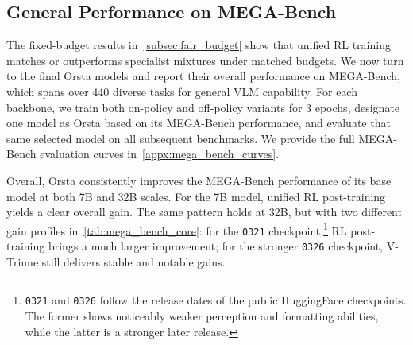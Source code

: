 \begin{table}[t]
\begin{minipage}[t]{0.68\linewidth}
\vspace{10pt}

\label{tab:gui_extension}
\vspace{4pt}


\small
\setlength{\tabcolsep}{20pt}


\end{minipage}

\end{table}

\subsection{General Performance on MEGA-Bench}
\label{subsec:mega_bench}

The fixed-budget results in~\cref{subsec:fair_budget} show that unified RL training matches or outperforms specialist mixtures under matched budgets.
%
We now turn to the final Orsta models and report their overall performance on MEGA-Bench, which spans over 440 diverse tasks for general VLM capability.
%
For each backbone, we train both on-policy and off-policy variants for 3 epochs, designate one model as Orsta based on its MEGA-Bench performance, and evaluate that same selected model on all subsequent benchmarks.
%
We provide the full MEGA-Bench evaluation curves in~\cref{appx:mega_bench_curves}.

Overall, Orsta consistently improves the MEGA-Bench performance of its base model at both 7B and 32B scales.
%
For the 7B model, unified RL post-training yields a clear overall gain.
%
The same pattern holds at 32B, but with two different gain profiles in~\cref{tab:mega_bench_core}: for the \texttt{0321} checkpoint,\footnote{\texttt{0321} and \texttt{0326} follow the release dates of the public HuggingFace checkpoints. The former shows noticeably weaker perception and formatting abilities, while the latter is a stronger later release.} RL post-training brings a much larger improvement; for the stronger \texttt{0326} checkpoint, V-Triune still delivers stable and notable gains.

